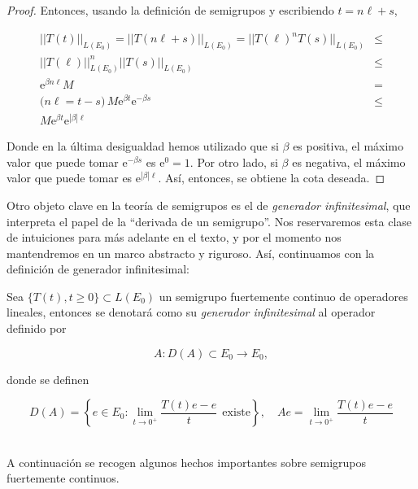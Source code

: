 \begin{proof}
Entonces, usando la definición de semigrupos y escribiendo $t = n\ell + s$,

\begin{align*}
||T(t)||_{L(E_0)} = ||T(n\ell + s)||_{L(E_0)} = ||T(\ell)^nT(s)||_{L(E_0)} &\leq\\ ||T(\ell)||^n_{L(E_0)}||T(s)||_{L(E_0)} &\leq\\
\mathrm{e}^{\beta n \ell}M &=\\
\text{(} n\ell = t - s \text{)} \, M\mathrm{e}^{\beta t}\mathrm{e}^{-\beta s}  &\leq\\
M\mathrm{e}^{\beta t}\mathrm{e}^{|\beta| \ell}
\end{align*}


Donde en la última desigualdad hemos utilizado que si $\beta$ es positiva, el máximo valor que puede tomar $\mathrm{e}^{-\beta s}$ es $\mathrm{e}^{0} = 1$. Por otro lado, si $\beta$ es negativa, el máximo valor que puede tomar es $\mathrm{e}^{|\beta| \ell}$. Así, entonces, se obtiene la cota deseada.
\end{proof}

Otro objeto clave en la teoría de semigrupos es el de \textit{generador infinitesimal}, que interpreta el papel de la ``derivada de un semigrupo''. Nos reservaremos esta clase de intuiciones para más adelante en el texto, y por el momento nos mantendremos en un marco abstracto y riguroso. Así, continuamos con la definición de generador infinitesimal:\\

\begin{Definicion}
\label{ch:semigrupos:def:generador}

Sea $\{T(t), t \geq 0\} \subset L(E_0)$ un semigrupo fuertemente continuo de operadores lineales, entonces se denotará como su \textit{generador infinitesimal} al operador definido por

\[A : D(A) \subset E_0 \rightarrow E_0,\]

donde se definen

\[D(A) = \left \{e \in E_0 : \lim_{t \rightarrow 0^+} \frac{T(t)e - e}{t} \ \ \text{existe} \right \}, \quad Ae = \lim_{t\rightarrow 0^+} \frac{T(t)e - e}{t }\]\\
\end{Definicion}

A continuación se recogen algunos hechos importantes sobre semigrupos fuertemente continuos.\\

